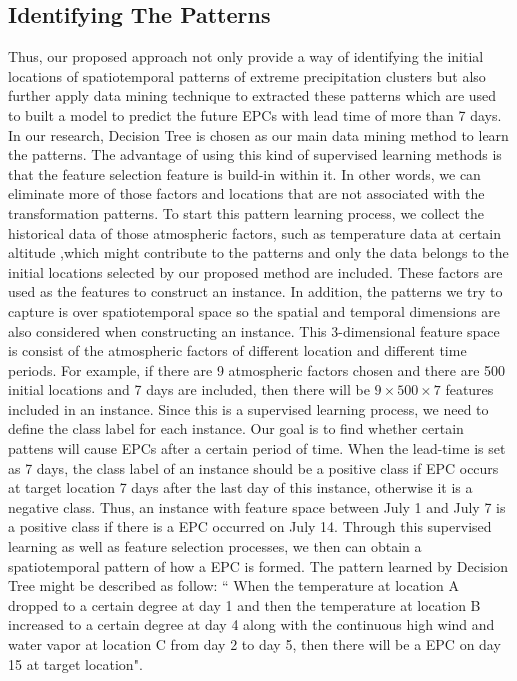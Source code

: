 \documentclass{acm_proc_article-sp}
\begin{document}
\subsection{Identifying The Patterns}
\label{sec:patterns}  
Thus, our proposed approach not only provide a way of identifying the initial locations of spatiotemporal patterns of extreme precipitation clusters but also further apply data mining technique to extracted these patterns which are used to built a model to predict the future EPCs with lead time of more than 7 days. In our research, Decision Tree is chosen as our main data mining method to learn the patterns. The advantage of using this kind of supervised learning methods is that the feature selection feature is build-in within it. In other words, we can eliminate more of those factors and locations that are not associated with the transformation patterns.
\newline
To start this pattern learning process, we collect the historical data of those atmospheric factors, such as temperature data at certain altitude ,which might contribute to the patterns and only the data belongs to the initial locations selected by our proposed method are included. These factors are used as the features to construct an instance. In addition, the patterns we try to capture is over spatiotemporal space so the spatial and temporal dimensions are also considered when constructing an instance. This 3-dimensional feature space is consist of the atmospheric factors of different location and different time periods. For example, if there are 9 atmospheric factors chosen and there are 500 initial locations and 7 days are included, then there will be $ 9 \times 500 \times 7 $ features included in an instance.
\newline
Since this is a supervised learning process, we need to define the class label for each instance. Our goal is to find whether certain pattens will cause EPCs after a certain period of time. When the lead-time is set as 7 days, the class label of an instance should be a positive class if EPC occurs at target location 7 days after the last day of this instance, otherwise it is a negative class. Thus, an instance with feature space between July 1 and July 7 is a positive class if there is a EPC occurred on July 14.
\newline 
Through this supervised learning as well as feature selection processes, we then can obtain a spatiotemporal pattern of how a EPC is formed. The pattern learned by Decision Tree might be described as follow: `` When the temperature at location A dropped to a certain degree at day 1 and then the temperature at location B increased to a certain degree at day 4 along with the continuous high wind and water vapor at location C from day 2 to day 5, then there will be a EPC on day 15 at target location".  
\end{document}

